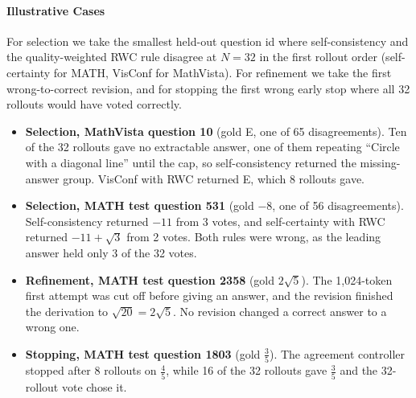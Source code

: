 \documentclass{article}
\begin{document}
\paragraph{Illustrative Cases}
\label{app:t3cases}
For selection we take the smallest held-out question id where self-consistency and the quality-weighted RWC rule disagree at $N=32$ in the first rollout order (self-certainty for MATH, VisConf for MathVista). For refinement we take the first wrong-to-correct revision, and for stopping the first wrong early stop where all 32 rollouts would have voted correctly.
\begin{itemize}
\item \textbf{Selection, MathVista question 10} (gold E, one of 65 disagreements). Ten of the 32 rollouts gave no extractable answer, one of them repeating ``Circle with a diagonal line'' until the cap, so self-consistency returned the missing-answer group. VisConf with RWC returned E, which 8 rollouts gave.
\item \textbf{Selection, MATH test question 531} (gold $-8$, one of 56 disagreements). Self-consistency returned $-11$ from 3 votes, and self-certainty with RWC returned $-11+\sqrt3$ from 2 votes. Both rules were wrong, as the leading answer held only 3 of the 32 votes.
\item \textbf{Refinement, MATH test question 2358} (gold $2\sqrt5$). The 1,024-token first attempt was cut off before giving an answer, and the revision finished the derivation to $\sqrt{20}=2\sqrt5$. No revision changed a correct answer to a wrong one.
\item \textbf{Stopping, MATH test question 1803} (gold $\tfrac35$). The agreement controller stopped after 8 rollouts on $\tfrac45$, while 16 of the 32 rollouts gave $\tfrac35$ and the 32-rollout vote chose it.
\end{itemize}
\end{document}
